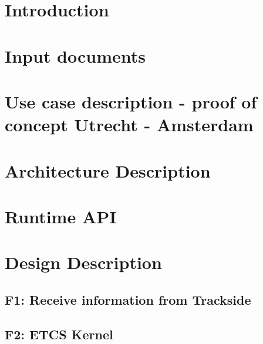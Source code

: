 \documentclass{template/openetcs_report}
\begin{document}

\mainmatter

\chapter{Introduction}



\glsaddall
\printglossaries

\chapter{Input documents}


\chapter{Use case description - proof of concept Utrecht - Amsterdam}


\chapter{Architecture Description}


\chapter{Runtime API}


\chapter{Design Description}

\section{F1: Receive information from Trackside}
\section{F2: ETCS Kernel}

\end{document}
